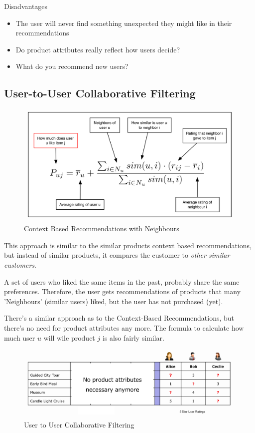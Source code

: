 \documentclass[11pt]{article}
\begin{document}
Disadvantages

\begin{itemize}
    \item The user will never find something unexpected they might like in their recommendations
    \item Do product attributes really reflect how users decide?
    \item What do you recommend new users?
\end{itemize}


\subsection{User-to-User Collaborative Filtering}

\begin{figure}
    \centering
    \includegraphics[keepaspectratio=true,height=10\baselineskip]{user_similarity.png}
    \caption{Context Based Recommendations with Neighbours}
    \label{fig:neighbours}
\end{figure}
This approach is similar to the similar products context based recommendations, but instead of similar products, it compares the customer to \textit{other similar customers}.

A set of users who liked the same items in the past, probably share the same preferences. Therefore, the user gets recommendations of products that many 'Neighbours' (similar users) liked, but the user has not purchased (yet).


There's a similar approach as to the Context-Based Recommendations, but there's no need for product attributes any more. The formula to calculate how much user $u$ will wile product $j$ is also fairly similar.

\begin{figure}[htb!]
    \centering
    \includegraphics[keepaspectratio=true, width=\linewidth]{user_to_user_collaborative_filtering.png}
    \caption{User to User Collaborative Filtering}
    \label{fig:user_to_user_collaborative_filtering}
\end{figure}
\end{document}
